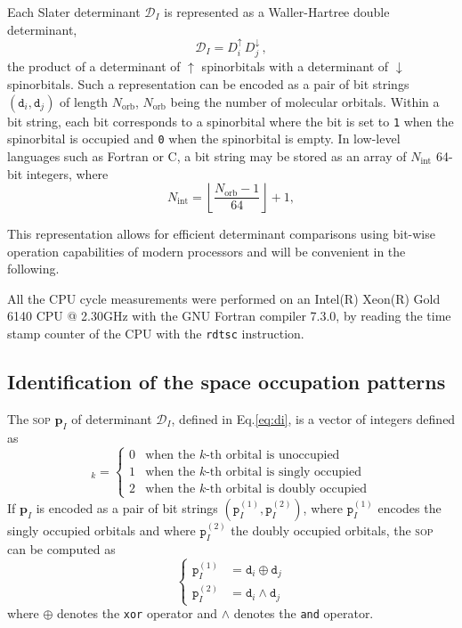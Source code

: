 \documentclass[aip,jcp,reprint,showkeys]{revtex4-1}
\newcommand{\md}{\mathtt{d}}
\newcommand{\mD}{\mathcal{D}}
\newcommand{\mpp}{\mathtt{p}}
\newcommand{\mpv}{\mathbf{p}}
\newcommand{\up}{\uparrow}
\newcommand{\dn}{\downarrow}
\newcommand{\Nint}{{N_\text{int}}}
\newcommand{\Norb}{{N_\text{orb}}}
\newcommand{\one}{{\texttt{1}}}
\newcommand{\zero}{{\texttt{0}}}
\newcommand{\sop}{\textsc{sop}}
\begin{document}
Each Slater determinant $\mD_I$ is represented as a Waller-Hartree double
determinant,\cite{Pauncz_1989}
\begin{equation}
 \label{eq:di}
 \mD_I = D_i^\up \, D_j^\dn\, ,
\end{equation}
the product of a determinant of
$\up$ spinorbitals with a determinant of $\dn$ spinorbitals.
Such a representation can be encoded as a pair of bit strings $(\md_i,\md_j)$ of length $\Norb$,  $\Norb$ being the number of molecular orbitals.
Within a bit string, each bit corresponds to a spinorbital where the bit is set to \one{} when the
spinorbital is occupied and \zero{} when the spinorbital is empty. In low-level languages such as Fortran or C, a bit
string may be stored as an array of $\Nint$ 64-bit integers, where 
\begin{equation}
  \Nint = \left \lfloor \frac{\Norb-1}{64} \right \rfloor + 1,
\end{equation}

This representation allows for efficient determinant comparisons using bit-wise operation 
capabilities of modern processors\cite{Scemama_2013} and will be convenient in the following.

All the CPU cycle measurements were performed on an Intel(R) Xeon(R)
Gold 6140 CPU @ 2.30GHz with the GNU Fortran compiler 7.3.0, by reading
the time stamp counter of the CPU with the \texttt{rdtsc} instruction.


\subsection{Identification of the space occupation patterns}

The {\sop} $\mpv_I$ of determinant $\mD_I$, 
defined in Eq.\eqref{eq:di},
is a vector of integers defined as
\begin{equation}
  [\mpv_I]_k = 
  \begin{cases} 
    0 & \text{when the $k$-th orbital is unoccupied} \\
    1 & \text{when the $k$-th orbital is singly occupied} \\
    2 & \text{when the $k$-th orbital is doubly occupied}
  \end{cases} 
\end{equation}
If $\mpv_I$ is encoded as a pair of bit strings $(\mpp_I^{(1)}, \mpp_I^{(2)})$, where
$\mpp_I^{(1)}$ encodes the singly occupied orbitals and where $\mpp_I^{(2)}$ the doubly
occupied orbitals, the {\sop} can be computed as
\begin{equation}
\label{eq:sop}
\begin{cases}
  \mpp_I^{(1)} & = \md_i \oplus \md_j \\
  \mpp_I^{(2)} & = \md_i \wedge \md_j 
  \end{cases} 
\end{equation}
where $\oplus$ denotes the \texttt{xor} operator and $\wedge$ denotes the
\texttt{and} operator.
\end{document}
